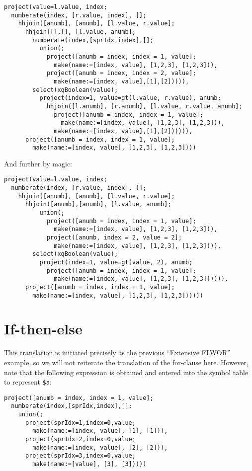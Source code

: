 \begin{Verbatim}
project(value=l.value, index;
  numberate(index, [r.value, index], [];
    hhjoin([anumb], [anumb], [l.value, r.value];
      hhjoin([],[], [l.value, anumb];
        numberate(index,[sprIdx,index],[];
          union(;
            project([anumb = index, index = 1, value];
              make(name:=[index, value], [1,2,3], [1,2,3])),
            project([anumb = index, index = 2, value];
              make(name:=[index, value],[1],[2])))),
        select(xqBoolean(value);
          project(index=1, value=gt(l.value, r.value), anumb;
            hhjoin([l.anumb], [r.anumb], [l.value, r.value, anumb];
              project([anumb = index, index = 1, value];
                make(name:=[index, value], [1,2,3], [1,2,3])),
              make(name:=[index, value],[1],[2]))))),
      project([anumb = index, index = 1, value];
        make(name:=[index, value], [1,2,3], [1,2,3])))
\end{Verbatim}

And further by magic:

\begin{Verbatim}
project(value=l.value, index;
  numberate(index, [r.value, index], [];
    hhjoin([anumb], [anumb], [l.value, r.value];
      hhjoin([anumb],[anumb], [l.value, anumb];
          union(;
            project([anumb = index, index = 1, value];
              make(name:=[index, value], [1,2,3], [1,2,3])),
            project([anumb, index = 2, value = 2];
              make(name:=[index, value], [1,2,3], [1,2,3]))),
        select(xqBoolean(value);
          project(index=1, value=gt(value, 2), anumb;
            project([anumb = index, index = 1, value];
              make(name:=[index, value], [1,2,3], [1,2,3]))))),
      project([anumb = index, index = 1, value];
        make(name:=[index, value], [1,2,3], [1,2,3])))))
\end{Verbatim}


\section{If-then-else}
\label{appendix:transl:ifthenelse}
This translation is initiated precisely as the previous ``Extensive FLWOR''
example, so we will not reiterate the translation of the for-clause here.
However, note that the following expression is obtained and entered into the
symbol table to represent \texttt{\$a}:

\begin{Verbatim}
project([anumb = index, index = 1, value];
  numberate(index,[sprIdx,index],[];
    union(;
      project(sprIdx=1,index=0,value;
        make(name:=[index, value], [1], [1])),
      project(sprIdx=2,index=0,value;
        make(name:=[index, value], [2], [2])),
      project(sprIdx=3,index=0,value;
        make(name:=[value], [3], [3]))))
\end{Verbatim}

